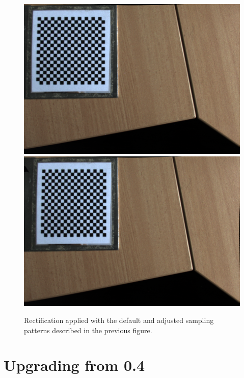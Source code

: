 \documentclass[onecolumn]{article}
\begin{document}
\begin{figure}[tbhp]
	\centering
	\includegraphics[width=1\textwidth]{Figs/IllumRectDefault}
	\includegraphics[width=1\textwidth]{Figs/IllumRectNonsquarePix}
	\caption{Rectification applied with the default and adjusted sampling patterns described in the previous figure.}
	\label{fig_AdjustRectIntrinsicResults}
\end{figure}

\section{Upgrading from 0.4}
\label{sect_Upgrading}
\end{document}
